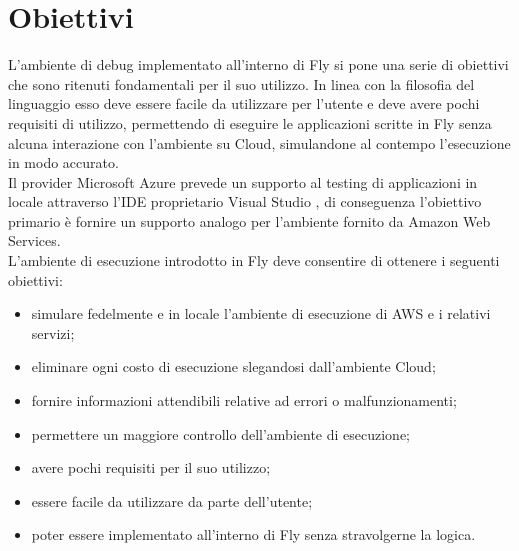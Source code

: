 \section{Obiettivi}
L’ambiente di debug implementato all’interno di Fly si pone una serie di obiettivi che sono ritenuti fondamentali per il suo utilizzo. In linea con la filosofia del linguaggio esso deve essere facile da utilizzare per l’utente e deve avere pochi requisiti di utilizzo, permettendo di eseguire le applicazioni scritte in Fly senza alcuna interazione con l’ambiente su Cloud, simulandone al contempo l’esecuzione in modo accurato.\\
Il provider Microsoft Azure prevede un supporto al testing di applicazioni in locale attraverso l’IDE proprietario Visual Studio \cite{visualStudio}, di conseguenza l’obiettivo primario è fornire un supporto analogo per l'ambiente fornito da Amazon Web Services.\\
L’ambiente di esecuzione introdotto in Fly deve consentire di ottenere i seguenti obiettivi:

\begin{itemize}
    \item simulare fedelmente e in locale l'ambiente di esecuzione di AWS e i relativi servizi;
    \item eliminare ogni costo di esecuzione slegandosi dall'ambiente Cloud;
    \item fornire informazioni attendibili relative ad errori o malfunzionamenti;
    \item permettere un maggiore controllo dell'ambiente di esecuzione;
    \item avere pochi requisiti per il suo utilizzo;
    \item essere facile da utilizzare da parte dell'utente;
    \item poter essere implementato all'interno di Fly senza stravolgerne la logica.
\end{itemize}

